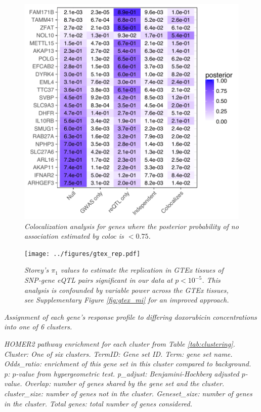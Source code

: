 \documentclass{article}
\begin{document}
\begin{figure}[h]
\begin{center}
    \includegraphics[width=.7\textwidth]{../figures/coloc.pdf} 
    \caption{\it{Colocalization analysis for genes where the posterior probability of no association estimated by \emph{coloc} is $<0.75$.}}
    \label{fig:coloc}
    \end{center}
\end{figure}

\begin{figure}[h]
\begin{center}
    \texttt{[image: ../figures/gtex\_rep.pdf]} 
    \caption{\it{Storey's $\pi_1$ values to estimate the replication in GTEx tissues of SNP-gene eQTL pairs significant in our data at $p < 10^{-5}$. This analysis is confounded by variable power across the GTEx tissues, see Supplementary Figure \ref{fig:gtex_mi} for an improved approach.}}
    \label{fig:gtex_pi0}
    \end{center}
\end{figure} 

\setcounter{table}{0}
\makeatletter 
\renewcommand{\thetable}{S\@arabic\c@table}

\begin{table} %
    \caption{\it{Assignment of each gene's response profile to differing doxorubicin concentrations into one of 6 clusters.}}
    \label{tab:clustering}
\end{table}

\begin{table}%
    \caption{\it{HOMER2 pathway enrichment for each cluster from Table \ref{tab:clustering}.  \emph{Cluster:} One of six clusters. \emph{TermID}: Gene set ID. \emph{Term}: gene set name.  \emph{Odds\_ratio}: enrichment of this gene set in this cluster compared to background. \emph{p}: $p$-value from hypergeometric test. \emph{p\_adjust}: Benjamini-Hochberg adjusted $p$-value. \emph{Overlap}: number of genes shared by the gene set and the cluster. \emph{cluster\_size}: number of genes not in the cluster.  \emph{Geneset\_size}: number of genes in the cluster. \emph{Total genes}: total number of genes considered.}}
    \label{tab:pathway_enrich}
\end{table}
\end{document}

